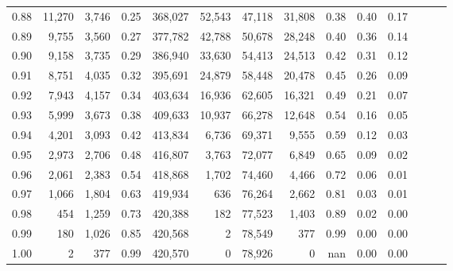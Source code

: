 \begin{tabular}{rrrrrrrrrrrrrr}
0.88 &  11,270 &  3,746 &  0.25 &  368,027 &   52,543 &  47,118 &  31,808 &  0.38 &  0.40 &      0.17 \\
0.89 &   9,755 &  3,560 &  0.27 &  377,782 &   42,788 &  50,678 &  28,248 &  0.40 &  0.36 &      0.14 \\
0.90 &   9,158 &  3,735 &  0.29 &  386,940 &   33,630 &  54,413 &  24,513 &  0.42 &  0.31 &      0.12 \\
0.91 &   8,751 &  4,035 &  0.32 &  395,691 &   24,879 &  58,448 &  20,478 &  0.45 &  0.26 &      0.09 \\
0.92 &   7,943 &  4,157 &  0.34 &  403,634 &   16,936 &  62,605 &  16,321 &  0.49 &  0.21 &      0.07 \\
0.93 &   5,999 &  3,673 &  0.38 &  409,633 &   10,937 &  66,278 &  12,648 &  0.54 &  0.16 &      0.05 \\
0.94 &   4,201 &  3,093 &  0.42 &  413,834 &    6,736 &  69,371 &   9,555 &  0.59 &  0.12 &      0.03 \\
0.95 &   2,973 &  2,706 &  0.48 &  416,807 &    3,763 &  72,077 &   6,849 &  0.65 &  0.09 &      0.02 \\
0.96 &   2,061 &  2,383 &  0.54 &  418,868 &    1,702 &  74,460 &   4,466 &  0.72 &  0.06 &      0.01 \\
0.97 &   1,066 &  1,804 &  0.63 &  419,934 &      636 &  76,264 &   2,662 &  0.81 &  0.03 &      0.01 \\
0.98 &     454 &  1,259 &  0.73 &  420,388 &      182 &  77,523 &   1,403 &  0.89 &  0.02 &      0.00 \\
0.99 &     180 &  1,026 &  0.85 &  420,568 &        2 &  78,549 &     377 &  0.99 &  0.00 &      0.00 \\
1.00 &       2 &    377 &  0.99 &  420,570 &        0 &  78,926 &       0 &   nan &  0.00 &      0.00 \\
\bottomrule
\end{tabular}
